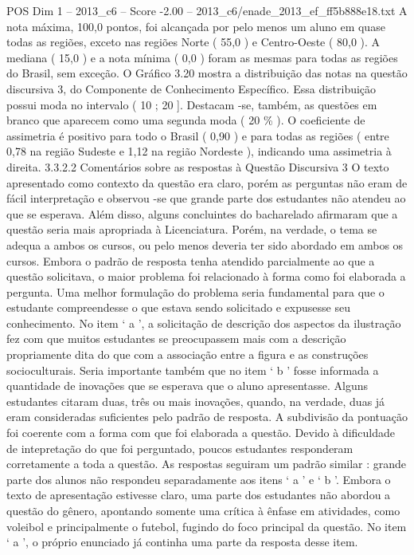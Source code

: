\begin{textsample}{POS Dim 1 – 2013\_c6 – Score -2.00 – 2013\_c6/enade\_2013\_ef\_ff5b888e18.txt}
A nota máxima, 100,0 pontos, foi alcançada por pelo menos um aluno em quase todas as regiões, exceto nas regiões Norte ( 55,0 ) e Centro-Oeste ( 80,0 ).
A mediana ( 15,0 ) e a nota mínima ( 0,0 ) foram as mesmas para todas as regiões do Brasil, sem exceção.
O Gráfico 3.20 mostra a distribuição das notas na questão discursiva 3, do Componente de Conhecimento Específico.
Essa distribuição possui moda no intervalo ( 10 ; 20 ].
Destacam -se, também, as questões em branco que aparecem como uma segunda moda ( 20 \% ).
O coeficiente de assimetria é positivo para todo o Brasil ( 0,90 ) e para todas as regiões ( entre 0,78 na região Sudeste e 1,12 na região Nordeste ), indicando uma assimetria à direita. 3.3.2.2 Comentários sobre as respostas à Questão Discursiva 3 O texto apresentado como contexto da questão era claro, porém as perguntas não eram de fácil interpretação e observou -se que grande parte dos estudantes não atendeu ao que se esperava.
Além disso, alguns concluintes do bacharelado afirmaram que a questão seria mais apropriada à Licenciatura.
Porém, na verdade, o tema se adequa a ambos os cursos, ou pelo menos deveria ter sido abordado em ambos os cursos.
Embora o padrão de resposta tenha atendido parcialmente ao que a questão solicitava, o maior problema foi relacionado à forma como foi elaborada a pergunta.
Uma melhor formulação do problema seria fundamental para que o estudante compreendesse o que estava sendo solicitado e expusesse seu conhecimento.
No item ‘ a ’, a solicitação de descrição dos aspectos da ilustração fez com que muitos estudantes se preocupassem mais com a descrição propriamente dita do que com a associação entre a figura e as construções socioculturais.
Seria importante também que no item ‘ b ’ fosse informada a quantidade de inovações que se esperava que o aluno apresentasse.
Alguns estudantes citaram duas, três ou mais inovações, quando, na verdade, duas já eram consideradas suficientes pelo padrão de resposta.
A subdivisão da pontuação foi coerente com a forma com que foi elaborada a questão.
Devido à dificuldade de intepretação do que foi perguntado, poucos estudantes responderam corretamente a toda a questão.
As respostas seguiram um padrão similar : grande parte dos alunos não respondeu separadamente aos itens ‘ a ’ e ‘ b ’.
Embora o texto de apresentação estivesse claro, uma parte dos estudantes não abordou a questão do gênero, apontando somente uma crítica à ênfase em atividades, como voleibol e principalmente o futebol, fugindo do foco principal da questão.
No item ‘ a ’, o próprio enunciado já continha uma parte da resposta desse item.

\end{textsample}
